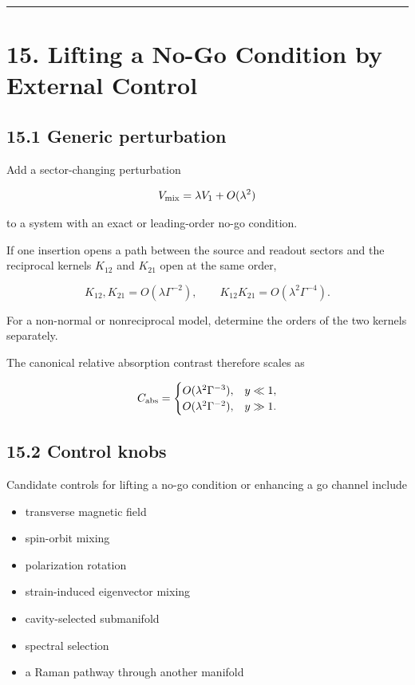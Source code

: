 \documentclass[
  10pt,
  a4paper,
]{article}
\providecommand{\tightlist}{%
  \setlength{\itemsep}{0pt}\setlength{\parskip}{0pt}}
\begin{document}
\begin{center}\rule{0.5\linewidth}{0.5pt}\end{center}

\section{15. Lifting a No-Go Condition by External
Control}\label{lifting-a-no-go-condition-by-external-control}

\subsection{15.1 Generic perturbation}\label{generic-perturbation}

Add a sector-changing perturbation

\[
V_{\rm mix}=\lambda V_1+O(\lambda^2)
\]

to a system with an exact or leading-order no-go condition.

If one insertion opens a path between the source and readout sectors and
the reciprocal kernels \(K_{12}\) and \(K_{21}\) open at the same order,

\[
K_{12},K_{21}=O(\lambda\Gamma^{-2}),
\qquad
K_{12}K_{21}=O(\lambda^2\Gamma^{-4}).
\]

For a non-normal or nonreciprocal model, determine the orders of the two
kernels separately.

The canonical relative absorption contrast therefore scales as

\[
C_{\rm abs}=
\begin{cases}
O(\lambda^2\Gamma^{-3}), & y\ll1,\\
O(\lambda^2\Gamma^{-2}), & y\gg1.
\end{cases}
\]

\subsection{15.2 Control knobs}\label{control-knobs}

Candidate controls for lifting a no-go condition or enhancing a go
channel include

\begin{itemize}
\tightlist
\item
  transverse magnetic field
\item
  spin-orbit mixing
\item
  polarization rotation
\item
  strain-induced eigenvector mixing
\item
  cavity-selected submanifold
\item
  spectral selection
\item
  a Raman pathway through another manifold
\end{itemize}
\end{document}
